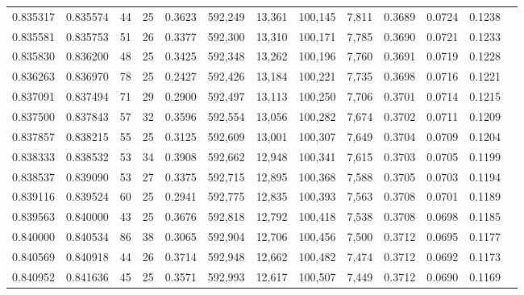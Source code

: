 \begin{tabular}{rrrrrrrrrrrrr}
0.835317 & 0.835574 &     44 &    25 &                                     0.3623 & 592,249 &  13,361 & 100,145 &   7,811 & 0.3689 & 0.0724 & 0.1238 \\
0.835581 & 0.835753 &     51 &    26 &                                     0.3377 & 592,300 &  13,310 & 100,171 &   7,785 & 0.3690 & 0.0721 & 0.1233 \\
0.835830 & 0.836200 &     48 &    25 &                                     0.3425 & 592,348 &  13,262 & 100,196 &   7,760 & 0.3691 & 0.0719 & 0.1228 \\
0.836263 & 0.836970 &     78 &    25 &                                     0.2427 & 592,426 &  13,184 & 100,221 &   7,735 & 0.3698 & 0.0716 & 0.1221 \\
0.837091 & 0.837494 &     71 &    29 &                                     0.2900 & 592,497 &  13,113 & 100,250 &   7,706 & 0.3701 & 0.0714 & 0.1215 \\
0.837500 & 0.837843 &     57 &    32 &                                     0.3596 & 592,554 &  13,056 & 100,282 &   7,674 & 0.3702 & 0.0711 & 0.1209 \\
0.837857 & 0.838215 &     55 &    25 &                                     0.3125 & 592,609 &  13,001 & 100,307 &   7,649 & 0.3704 & 0.0709 & 0.1204 \\
0.838333 & 0.838532 &     53 &    34 &                                     0.3908 & 592,662 &  12,948 & 100,341 &   7,615 & 0.3703 & 0.0705 & 0.1199 \\
0.838537 & 0.839090 &     53 &    27 &                                     0.3375 & 592,715 &  12,895 & 100,368 &   7,588 & 0.3705 & 0.0703 & 0.1194 \\
0.839116 & 0.839524 &     60 &    25 &                                     0.2941 & 592,775 &  12,835 & 100,393 &   7,563 & 0.3708 & 0.0701 & 0.1189 \\
0.839563 & 0.840000 &     43 &    25 &                                     0.3676 & 592,818 &  12,792 & 100,418 &   7,538 & 0.3708 & 0.0698 & 0.1185 \\
0.840000 & 0.840534 &     86 &    38 &                                     0.3065 & 592,904 &  12,706 & 100,456 &   7,500 & 0.3712 & 0.0695 & 0.1177 \\
0.840569 & 0.840918 &     44 &    26 &                                     0.3714 & 592,948 &  12,662 & 100,482 &   7,474 & 0.3712 & 0.0692 & 0.1173 \\
0.840952 & 0.841636 &     45 &    25 &                                     0.3571 & 592,993 &  12,617 & 100,507 &   7,449 & 0.3712 & 0.0690 & 0.1169 \\

\end{tabular}
